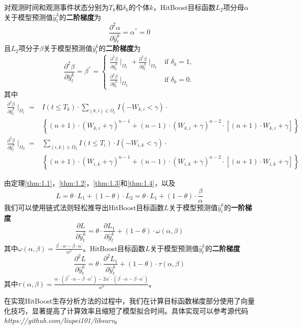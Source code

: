 \begin{theorem}\label{thm:1.4}
对观测时间和观测事件状态分别为$T_k$和$\delta_k$的个体$k$，HitBoost目标函数$L_2$项分母$\alpha$关于模型预测值$\hat{y}_t^k$的\textbf{二阶梯度}为$$
\frac{\partial^2 \alpha}{\partial \hat{y}_t^k}=\alpha^{''}=0
$$ 且$L_2$项分子$\beta$关于模型预测值$\hat{y}_t^k$的\textbf{二阶梯度}为$$
\frac{\partial^2 \beta}{\partial \hat{y}_t^k}=\beta^{''}=
\begin{cases}
\frac{\partial^2 \beta}{\partial \hat{y}_t^k} \mid_{\Omega_1} + \frac{\partial^2 \beta}{\partial \hat{y}_t^k} \mid_{\Omega_2} & \text{if } \delta_k = 1,\\
\frac{\partial^2 \beta}{\partial \hat{y}_t^k} \mid_{\Omega_2} & \text{if } \delta_k = 0.
\end{cases}
$$ 其中\[
\begin{split}
\frac{\partial^2 \beta}{\partial \hat{y}_t^k} \mid_{\Omega_1} =& I(t\le T_k)\cdot \sum\limits_{(k,i)\in \Omega_1} I(-W_{k,i}<\gamma)\cdot \\
  & \left\{(n+1)\cdot (W_{k,i}+\gamma)^{n-1} + (n-1)\cdot (W_{k,i}+\gamma)^{n-2}\cdot [(n+1)\cdot W_{k,i}+\gamma]\right\} \\
\frac{\partial^2 \beta}{\partial \hat{y}_t^k} \mid_{\Omega_2} =& \sum\limits_{(i,k)\in \Omega_2} I(t\le T_i)\cdot I(-W_{i,k}<\gamma)\cdot \\
  & \left\{(n+1)\cdot (W_{i,k}+\gamma)^{n-1} + (n-1)\cdot (W_{i,k}+\gamma)^{n-2}\cdot [(n+1)\cdot W_{i,k}+\gamma]\right\}
\end{split}
\]
\end{theorem}

由定理\ref{thm:1.1}，\ref{thm:1.2}，\ref{thm:1.3}和\ref{thm:1.4}，以及$$
L=\theta\cdot L_1 + (1-\theta)\cdot L_2= \theta\cdot L_1 + (1-\theta)\cdot \frac{\beta}{\alpha}
$$ 我们可以使用链式法则轻松推导出HitBoost目标函数$L$关于模型预测值$\hat{y}_t^k$的\textbf{一阶梯度}$$
\frac{\partial L}{\partial \hat{y}_t^k}=\theta\cdot \frac{\partial L_1}{\partial \hat{y}_t^k} + (1-\theta)\cdot \omega(\alpha, \beta)
$$ 其中$\omega(\alpha, \beta)=\frac{\beta^{'}\cdot \alpha - \beta\cdot \alpha^{'}}{\alpha^2}$。HitBoost目标函数$L$关于模型预测值$\hat{y}_t^k$的\textbf{二阶梯度}$$
\frac{\partial^2 L}{\partial \hat{y}_t^k}=\theta\cdot \frac{\partial^2 L_1}{\partial \hat{y}_t^k} + (1-\theta)\cdot \tau(\alpha, \beta)
$$ 其中$\tau(\alpha, \beta)=\frac{\alpha\cdot (\beta^{''}\cdot \alpha - \beta\cdot \alpha^{''})-2\alpha^{'}\cdot (\beta^{'}\cdot \alpha - \beta\cdot \alpha^{'})}{\alpha^3}$。

在实现HitBoost生存分析方法的过程中，我们在计算目标函数梯度部分使用了向量化技巧，显著提高了计算效率且缩短了模型拟合时间。具体实现可以参考源代码\emph{https://github.com/liupei101/libsurv}。

